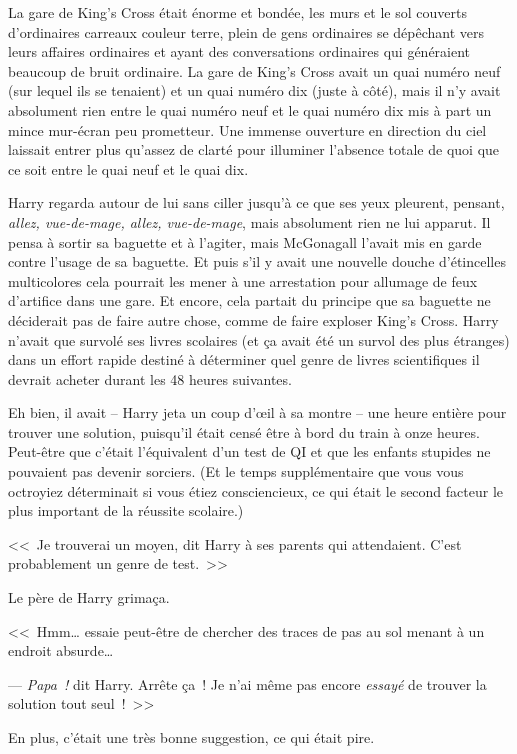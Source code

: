 La gare de King's Cross était énorme et bondée, les murs et le sol couverts d'ordinaires carreaux couleur terre, plein de gens ordinaires se dépêchant vers leurs affaires ordinaires et ayant des conversations ordinaires qui généraient beaucoup de bruit ordinaire. La gare de King's Cross avait un quai numéro neuf (sur lequel ils se tenaient) et un quai numéro dix (juste à côté), mais il n'y avait absolument rien entre le quai numéro neuf et le quai numéro dix mis à part un mince mur-écran peu prometteur. Une immense ouverture en direction du ciel laissait entrer plus qu'assez de clarté pour illuminer l'absence totale de quoi que ce soit entre le quai neuf et le quai dix.

Harry regarda autour de lui sans ciller jusqu'à ce que ses yeux pleurent, pensant, \emph{allez, vue-de-mage, allez, vue-de-mage}, mais absolument rien ne lui apparut. Il pensa à sortir sa baguette et à l'agiter, mais McGonagall l'avait mis en garde contre l'usage de sa baguette. Et puis s'il y avait une nouvelle douche d'étincelles multicolores cela pourrait les mener à une arrestation pour allumage de feux d'artifice dans une gare. Et encore, cela partait du principe que sa baguette ne déciderait pas de faire autre chose, comme de faire exploser King's Cross. Harry n'avait que survolé ses livres scolaires (et ça avait été un survol des plus étranges) dans un effort rapide destiné à déterminer quel genre de livres scientifiques il devrait acheter durant les 48 heures suivantes.

Eh bien, il avait -- Harry jeta un coup d'œil à sa montre -- une heure entière pour trouver une solution, puisqu'il était censé être à bord du train à onze heures. Peut-être que c'était l'équivalent d'un test de QI et que les enfants stupides ne pouvaient pas devenir sorciers. (Et le temps supplémentaire que vous vous octroyiez déterminait si vous étiez consciencieux, ce qui était le second facteur le plus important de la réussite scolaire.)

<<~Je trouverai un moyen, dit Harry à ses parents qui attendaient. C'est probablement un genre de test.~>>

Le père de Harry grimaça.

<<~Hmm… essaie peut-être de chercher des traces de pas au sol menant à un endroit absurde…

--- \emph{Papa~!} dit Harry. Arrête ça~! Je n'ai même pas encore \emph{essayé} de trouver la solution tout seul~!~>>

En plus, c'était une très bonne suggestion, ce qui était pire.

